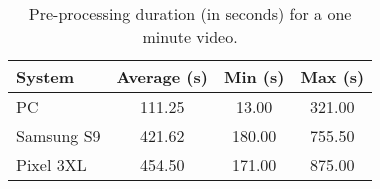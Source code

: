 \begin{table}[b!]
\centering
\begin{tabular}{|l|c|c|c|}
\hline
\textbf{System} & \textbf{Average (s)} & \textbf{Min (s)} & \textbf{Max (s)} \\
\hline
PC              & 111.25 & 13.00 & 321.00 \\
Samsung S9      & 421.62 & 180.00 & 755.50 \\
Pixel 3XL       & 454.50 & 171.00 & 875.00 \\
\hline
\end{tabular}
\caption{Pre-processing duration (in seconds) for a one minute video.}
\label{table:preprocessing_times}
\end{table}
 